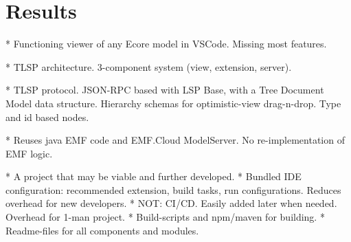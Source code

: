 \chapter{Results}\label{chap:results}


* Functioning viewer of any Ecore model in VSCode. Missing most features.

* TLSP architecture. 3-component system (view, extension, server).

* TLSP protocol. JSON-RPC based with LSP Base, with a Tree Document Model data structure. Hierarchy schemas for optimistic-view drag-n-drop. Type and id based nodes. 

* Reuses java EMF code and EMF.Cloud ModelServer. No re-implementation of EMF logic.

* A project that may be viable and further developed.
  * Bundled IDE configuration: recommended extension, build tasks, run configurations. Reduces overhead for new developers.
  * NOT: CI/CD. Easily added later when needed. Overhead for 1-man project.
  * Build-scripts and npm/maven for building.
  * Readme-files for all components and modules.
